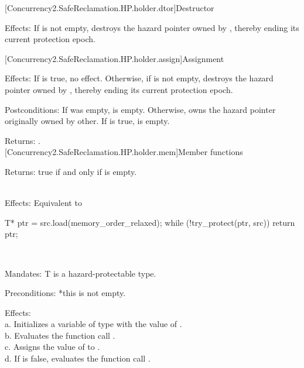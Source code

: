 [Concurrency2.SafeReclamation.HP.holder.dtor]{Destructor}


\pnum
Effects: If  is not empty, destroys the hazard pointer owned by , thereby ending its current protection epoch.

[Concurrency2.SafeReclamation.HP.holder.assign]{Assignment}


\pnum
Effects: If  is true, no effect. Otherwise, if  is not empty, destroys
the hazard pointer owned by , thereby ending its current protection epoch.

\pnum
Postconditions: If  was empty,  is empty. Otherwise,  owns the hazard
pointer originally owned by other. If  is true,  is empty.

\pnum
Returns: .
\\

[Concurrency2.SafeReclamation.HP.holder.mem]{Member functions}


\pnum
Returns: true if and only if  is empty.
\\

\\
\hspace*{1.1em}

\pnum
Effects: Equivalent to
\begin{codeblock}
T* ptr = src.load(memory_order_relaxed);
while (!try_protect(ptr, src)) {}
return ptr;
\end{codeblock}

\\
\hspace*{1.1em}

\pnum
Mandates: T is a hazard-protectable type.

\pnum
Preconditions: *this is not empty.

\pnum
Effects:\\
a. Initializes a variable  of type  with the value of .\\
b. Evaluates the function call .\\
c. Assigns the value of  to .\\
d. If  is false, evaluates the function call .

